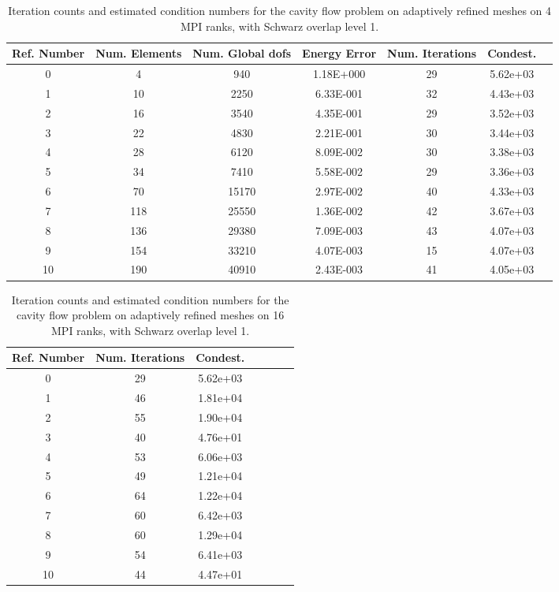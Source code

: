 \documentclass[11pt]{amsart}
\begin{document}
\begin{table}
\begin{tabular}{ c  c  c  c  c  c c}
Ref. Number	&Num. Elements	& Num. Global dofs		&Energy Error	&Num. Iterations	&Condest.\\
\hline
0	&4	&940	&1.18E+000	&29	&5.62e+03\\
1	&10	&2250	&6.33E-001	&32	&4.43e+03\\
2	&16	&3540	&4.35E-001	&29	&3.52e+03\\
3	&22	&4830	&2.21E-001	&30	&3.44e+03\\
4	&28	&6120	&8.09E-002	&30	&3.38e+03\\
5	&34	&7410	&5.58E-002	&29	&3.36e+03\\
6	&70	&15170	&2.97E-002	&40	&4.33e+03\\
7	&118	&25550	&1.36E-002	&42	&3.67e+03\\
8	&136	&29380	&7.09E-003	&43	&4.07e+03\\
9	&154	&33210	&4.07E-003	&15	&4.07e+03\\
10	&190	&40910	&2.43E-003	&41	&4.05e+03\\
\end{tabular}
\caption{Iteration counts and estimated condition numbers for the cavity flow problem on adaptively refined meshes on 4 MPI ranks, with Schwarz overlap level 1.}
\label{table:stokesConditioningStudyAdaptiveMeshes4RanksOverlap1}
\end{table}

\begin{table}
\begin{tabular}{ c  c  c  c  c  c c}
Ref. Number	&Num. Iterations	&Condest.\\
\hline
0	&29	&5.62e+03\\
1	&46	&1.81e+04\\
2	&55	&1.90e+04\\
3	&40	&4.76e+01\\
4	&53	&6.06e+03\\
5	&49	&1.21e+04\\
6	&64	&1.22e+04\\
7	&60	&6.42e+03\\
8	&60	&1.29e+04\\
9	&54	&6.41e+03\\
10 	&44	&4.47e+01\\
\end{tabular}
\caption{Iteration counts and estimated condition numbers for the cavity flow problem on adaptively refined meshes on 16 MPI ranks, with Schwarz overlap level 1.}
\label{table:stokesConditioningStudyAdaptiveMeshes16RanksOverlap1}
\end{table}
\end{document}
